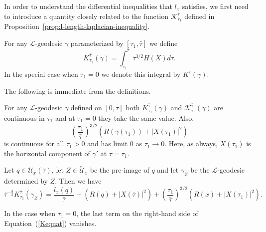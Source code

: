 In order to understand the differential inequalities that $l_x$
satisfies, we first need to introduce a quantity closely related to
the function ${\mathcal K}^{\bar\tau}_{\tau_1}$ defined in
Proposition~\ref{prop:l-length-laplacian-inequality}.

\begin{definition}\label{def:reduced-length-k-quantity}
For any ${\mathcal L}$-geodesic $\gamma$ parameterized by $[\tau_1,\bar\tau]$
we define
$$K_{\tau_1}^{\bar\tau}(\gamma)=
\int_{\tau_1}^{\bar\tau}\tau^{3/2}H(X)d\tau.$$
In the special case when $\tau_1=0$ we denote this integral by
$K^{\bar\tau}(\gamma)$.
\end{definition}

The following is immediate from the definitions.

\begin{lemma}\label{lem:k-quantity-continuity}
\label{Kequal}
For any ${\mathcal L}$-geodesic $\gamma$ defined on $[0,\bar\tau]$ both
$K^{\bar\tau}_{\tau_1}(\gamma)$ and ${\mathcal K}^{\bar\tau}_{\tau_1}(\gamma)$
are continuous in $\tau_1$ and at $\tau_1=0$ they take the same value. Also,
$$\left(\frac{\tau_1}{\bar\tau}\right)^{3/2}\left(R(\gamma(\tau_1))+|X(\tau_1)|^2\right)$$
is continuous for all $\tau_1> 0$ and has limit $0$ as
$\tau_1\rightarrow 0$. Here, as always, $X(\tau_1)$ is the
horizontal component of $\gamma'$ at $\tau=\tau_1$.
\end{lemma}

\begin{lemma}\label{lem:reduced-length-k-formula}
\label{Keqn}
Let $q\in {\mathcal
U}_x(\bar\tau)$, let $Z\in \widetilde {\mathcal U}_x$ be the
pre-image of $q$ and let $\gamma_Z$ be the ${\mathcal L}$-geodesic
determined by $Z$. Then we have
\begin{equation}\label{Kequat}
\bar\tau^{-\frac{3}{2}}K^{\bar\tau}_{\tau_1}(\gamma_Z)=\frac{
l_x(q)}{\bar\tau}-(R(q)
+|X(\bar\tau)|^2)+\left(\frac{\tau_1}{\bar\tau}\right)^{3/2}\left(R(x)+|X(\tau_1)|^2\right).
\end{equation}


In the case when $\tau_1=0$, the last term on the right-hand side of
Equation~(\ref{Kequat}) vanishes.
\end{lemma}


